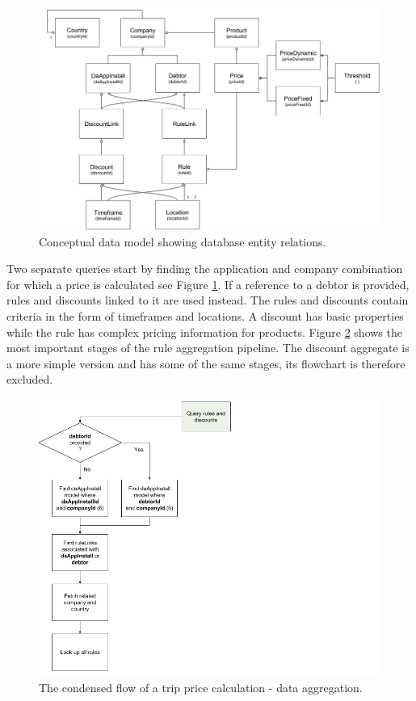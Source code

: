 \begin{figure}[H]
	\centering
	\includegraphics[width=1\textwidth]{DataModel}
	\caption[Data Model]{Conceptual data model showing database entity relations.}
	\label{fig:Data Model}
\end{figure}

Two separate queries start by finding the application and company combination for which a price is calculated see Figure \ref{fig:Data Model}. If a reference to a debtor is provided, rules and discounts linked to it are used instead. The rules and discounts contain criteria in the form of timeframes and locations. A discount has basic properties while the rule has complex pricing information for products. Figure \ref{fig:Data Aggregation} shows the most important stages of the rule aggregation pipeline. The discount aggregate is a more simple version and has some of the same stages, its flowchart is therefore excluded.

\begin{figure}[H]
	\centering
	\includegraphics[width=1\textwidth]{DataAggregation}
	\caption[Data Aggregation]{The condensed flow of a trip price calculation - data aggregation.}
	\label{fig:Data Aggregation}
\end{figure}

